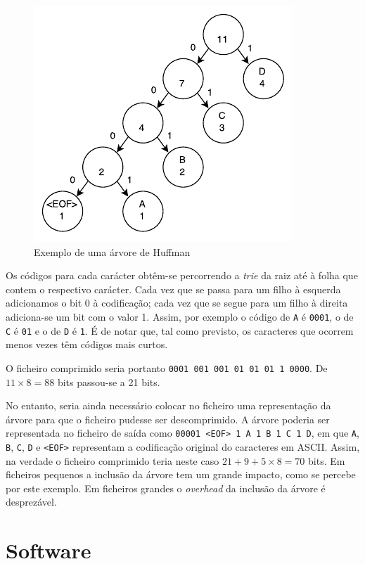 \documentclass[a4paper]{article}
\begin{document}
	\begin{figure}[h]
		\centering
		\includegraphics[width=.65\textwidth]{img/huffman_tree_example}
		\caption{Exemplo de uma árvore de Huffman}
		\label{fig:huffman_tree_example}
	\end{figure}
	
	Os códigos para cada carácter obtêm-se percorrendo a \textit{trie} da raiz até à folha que contem o respectivo carácter. Cada vez que se passa para um filho à esquerda adicionamos o bit 0 à codificação; cada vez que se segue para um filho à direita adiciona-se um bit com o valor 1. Assim, por exemplo o código de \texttt{A} é \texttt{0001}, o de \texttt{C} é \texttt{01} e o de \texttt{D} é \texttt{1}. É de notar que, tal como previsto, os caracteres que ocorrem menos vezes têm códigos mais curtos.
	
	O ficheiro comprimido seria portanto \texttt{0001 001 001 01 01 01 1 0000}. De $11 \times 8 = 88$ bits passou-se a 21 bits.
	
	No entanto, seria ainda necessário colocar no ficheiro uma representação da árvore para que o ficheiro pudesse ser descomprimido. A árvore poderia ser representada no ficheiro de saída como \texttt{00001 <EOF> 1 A 1 B 1 C 1 D}, em que \texttt{A}, \texttt{B}, \texttt{C}, \texttt{D} e \texttt{<EOF>} representam a codificação original do caracteres em ASCII. Assim, na verdade o ficheiro comprimido teria neste caso $21 + 9 + 5 \times 8 = 70$ bits. Em ficheiros pequenos a inclusão da árvore tem um grande impacto, como se percebe por este exemplo. Em ficheiros grandes o \textit{overhead} da inclusão da árvore é desprezável.
	
	\section{Software}
\end{document}
